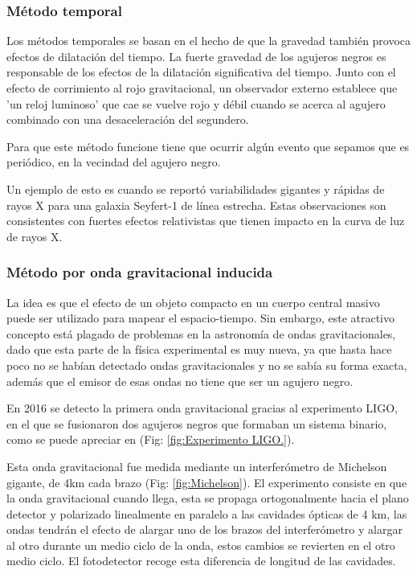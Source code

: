 \documentclass{article}
\begin{document}
\subsubsection{Método temporal}
Los métodos temporales se basan en el hecho de que la gravedad también provoca efectos de dilatación del tiempo. La fuerte gravedad de los agujeros negros es responsable de los efectos de la dilatación significativa del tiempo. Junto con el efecto de corrimiento al rojo gravitacional, un observador externo establece que 'un reloj luminoso' que cae se vuelve rojo y débil cuando se acerca al agujero combinado con una desaceleración del segundero.\cite{muller2007experimental}

Para que este método funcione tiene que ocurrir algún evento que sepamos que es periódico, en la vecindad del agujero negro.\cite{muller2007experimental} 

Un ejemplo de esto es cuando se reportó variabilidades gigantes y rápidas de rayos X para una galaxia Seyfert-1 de línea estrecha. Estas observaciones son consistentes con fuertes efectos relativistas que tienen impacto en la curva de luz de rayos X.\cite{muller2007experimental} 

\subsubsection{Método por onda gravitacional inducida}
La idea es que el efecto de un objeto compacto en un cuerpo central masivo puede ser utilizado para mapear el espacio-tiempo. Sin embargo, este atractivo concepto está plagado de problemas en la astronomía de ondas gravitacionales, dado que esta parte de la física experimental es muy nueva, ya que hasta hace poco no se habían detectado ondas gravitacionales y no se sabía su forma exacta, además que el emisor de esas ondas no tiene que ser un agujero negro.\cite{muller2007experimental}

En 2016 se detecto la primera onda gravitacional gracias al experimento LIGO, en el que se fusionaron dos agujeros negros que formaban un sistema binario, como se puede apreciar en (Fig: \ref{fig:Experimento LIGO.}).\cite{abbott2017observation} 

Esta onda gravitacional fue medida mediante un interferómetro de Michelson gigante, de 4km cada brazo (Fig: \ref{fig:Michelson}). El experimento consiste en que la onda gravitacional cuando llega, esta se propaga ortogonalmente hacia el plano detector y polarizado linealmente en paralelo a las cavidades ópticas de 4 km, las ondas tendrán el efecto de alargar uno de los brazos del interferómetro y alargar al otro durante un medio ciclo de la onda, estos cambios se revierten en el otro medio ciclo. El fotodetector recoge esta diferencia de longitud de las cavidades.\cite{abbott2017observation} 
\end{document}
